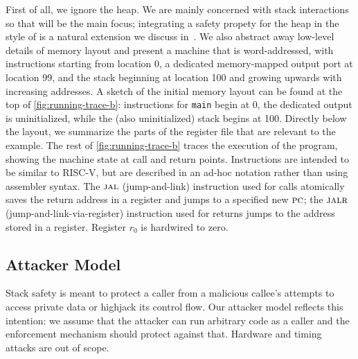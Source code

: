 \documentclass[acmsmall,review,anonymous]{acmart}\settopmatter{printfolios=true,printccs=false,printacmref=false}
\begin{document}
First of all, we ignore the heap. We are mainly concerned with stack
interactions so that will be the main focus; integrating a safety
propety for the heap in the
style of \citet{AzevedoDeAmorim17} is a natural extension we discuss
in~.
%
We also abstract away low-level details of memory layout and present a
machine that is word-addressed, with instructions starting from
location 0, a dedicated memory-mapped output port at location 99, and
the stack beginning at location 100 and growing upwards with increasing
addresses.  
%
A sketch of the initial memory layout can be found at the top of
\cref{fig:running-trace-b}: instructions for {\tt main} begin at 0,
the dedicated output is uninitialized, while the (also uninitialized)
stack begins at 100. Directly below the layout, we summarize the parts
of the register file that are relevant to the example.
%
The rest of \cref{fig:running-trace-b} traces the execution of the
program, showing the machine state at call and return points.
Instructions are intended to
be similar to RISC-V, but are described in an ad-hoc notation
rather than using assembler syntax. The $\textsc{jal}$ (jump-and-link)
instruction used for calls atomically saves the return address in a register
and jumps to a specified new $\textsc{pc}$; the $\textsc{jalr}$ (jump-and-link-via-register)
instruction used for returns jumps to the address stored in a register.
Register $r_0$ is hardwired to zero. 


\subsection{Attacker Model}

Stack safety is meant to protect a caller from a malicious callee's
attempts to access private data or highjack its control flow. Our
attacker model reflects this intention: we assume that the attacker
can run arbitrary code as a caller and the enforcement mechanism
should protect against that. Hardware and timing attacks are out of
scope. 
\end{document}

